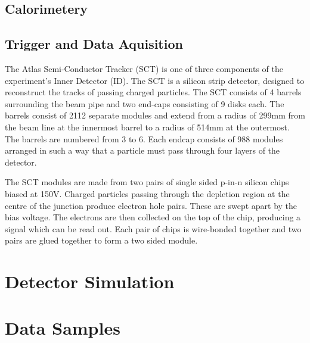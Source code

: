 \subsection{Calorimetery}
\subsection{Trigger and Data Aquisition}

\label{sec:Detector-SCT}

The Atlas Semi-Conductor Tracker (SCT) is one of three components of the experiment's Inner Detector (ID). The SCT is a silicon strip detector, designed to reconstruct the tracks of passing charged particles. The SCT consists of 4 barrels surrounding the beam pipe and two end-caps consisting of 9 disks each. The barrels consist of 2112 separate modules and extend from a radius of 299mm from the beam line at the innermost barrel to a radius of 514mm at the outermost. The barrels are numbered from 3 to 6. Each endcap consists of 988 modules arranged in such a way that a particle must pass through four layers of the detector.

The SCT modules are made from two pairs of single sided p-in-n silicon chips biased at 150V. Charged particles passing through the depletion region at the centre of the junction produce electron hole pairs. These are swept apart by the bias voltage. The electrons are then collected on the top of the chip, producing a signal which can be read out. Each pair of chips is wire-bonded together and two pairs are glued together to form a two sided module.

\section{Detector Simulation}
\section{Data Samples}
